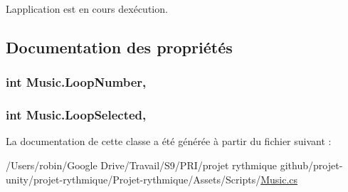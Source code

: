 L\textquotesingle{}application est en cours d\textquotesingle{}exécution. 



\subsection{Documentation des propriétés}
\hypertarget{class_music_a68d031f187927ba922a6ee304a561c07}{}
\subsubsection[{Loop\+Number}]{\setlength{\rightskip}{0pt plus 5cm}int Music.\+Loop\+Number\hspace{0.3cm}{\ttfamily [get]}, {\ttfamily [set]}}\label{class_music_a68d031f187927ba922a6ee304a561c07}
\hypertarget{class_music_a08b2e446def0d17e713d4f723811b3be}{}
\subsubsection[{Loop\+Selected}]{\setlength{\rightskip}{0pt plus 5cm}int Music.\+Loop\+Selected\hspace{0.3cm}{\ttfamily [get]}, {\ttfamily [set]}}\label{class_music_a08b2e446def0d17e713d4f723811b3be}


La documentation de cette classe a été générée à partir du fichier suivant \+:\begin{DoxyCompactItemize}
\item 
/\+Users/robin/\+Google Drive/\+Travail/\+S9/\+P\+R\+I/projet rythmique github/projet-\/unity/projet-\/rythmique/\+Projet-\/rythmique/\+Assets/\+Scripts/\hyperlink{_music_8cs}{Music.\+cs}\end{DoxyCompactItemize}
